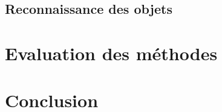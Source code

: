 \documentclass[a4paper,11pt]{article}
\begin{document}
\subsection{Reconnaissance des objets} 

\section{Evaluation des méthodes}

\section{Conclusion}
\end{document}
